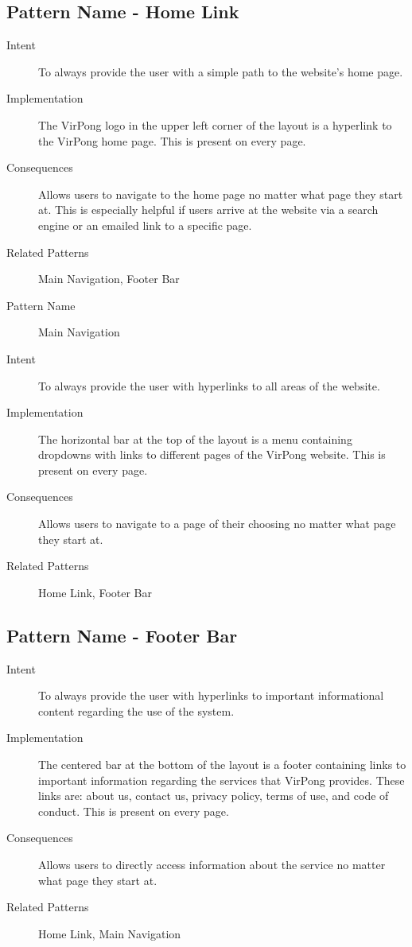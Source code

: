 		\subsection{Pattern Name - Home Link}
		\begin{description}
		\item[Intent] To always provide the user with a simple path to the website's home page.
		\item[Implementation] The VirPong logo in the upper left corner of the layout is a hyperlink to the VirPong home page. This is present on every page.
		\item[Consequences] Allows users to navigate to the home page no matter what page they start at. This is especially helpful if users arrive at the website via a search engine or an emailed link to a specific page.
		\item[Related Patterns] Main Navigation, Footer Bar
		\item[Pattern Name] Main Navigation
		\item[Intent] To always provide the user with hyperlinks to all areas of the website.
		\item[Implementation] The horizontal bar at the top of the layout is a menu containing dropdowns with links to different pages of the VirPong website. This is present on every page.
		\item[Consequences] Allows users to navigate to a page of their choosing no matter what page they start at.
		\item[Related Patterns] Home Link, Footer Bar
	\end{description}
	\subsection{Pattern Name - Footer Bar}
	\begin{description}
\item[Intent] To always provide the user with hyperlinks to important informational content regarding the use of the system.
\item[Implementation] The centered bar at the bottom of the layout is a footer containing links to important information regarding the services that VirPong provides. These links are: about us, contact us, privacy policy, terms of use, and code of conduct. This is present on every page.
\item[Consequences] Allows users to directly access information about the service no matter what page they start at.
\item[Related Patterns] Home Link, Main Navigation
\end{description}
